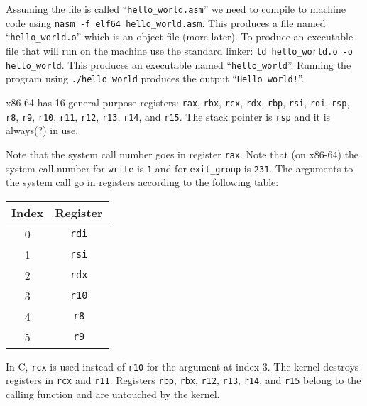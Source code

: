 Assuming the file is called ``\texttt{hello_world.asm}'' we need to
compile to machine code using \texttt{nasm -f elf64
  hello_world.asm}. This produces a file named
``\texttt{hello_world.o}'' which is an object file (more later). To
produce an executable file that will run on the machine use the standard linker:
\texttt{ld hello_world.o -o hello_world}. This produces an
executable named ``\texttt{hello_world}''. Running the program
using \texttt{./hello_world} produces the output
``\texttt{Hello world!}''.

x86-64 has 16 general purpose registers: \texttt{rax},
\texttt{rbx}, \texttt{rcx}, \texttt{rdx},
\texttt{rbp}, \texttt{rsi}, \texttt{rdi},
\texttt{rsp}, \texttt{r8}, \texttt{r9},
\texttt{r10}, \texttt{r11}, \texttt{r12},
\texttt{r13}, \texttt{r14}, and \texttt{r15}. The
stack pointer is \texttt{rsp} and it is always(?) in use.

Note that the system call number goes in register \texttt{rax}. Note
that (on x86-64) the system call number for \texttt{write} is
\texttt{1} and for \texttt{exit_group} is \texttt{231}. The arguments
to the system call go in registers according to the following table:

{\ttfamily\begin{tabular}{c c}
  \hline
  Index & Register \\
  \hline
  0 & \texttt{rdi} \\
  1 & \texttt{rsi} \\
  2 & \texttt{rdx} \\
  3 & \texttt{r10} \\
  4 & \texttt{r8} \\
  5 & \texttt{r9} \\
\end{tabular}}

In C, \texttt{rcx} is used instead of \texttt{r10} for the
argument at index 3. The kernel destroys registers in \texttt{rcx} and
\texttt{r11}. Registers \texttt{rbp}, \texttt{rbx},
\texttt{r12}, \texttt{r13}, \texttt{r14}, and
\texttt{r15} belong to the calling function and are untouched by the
kernel.
